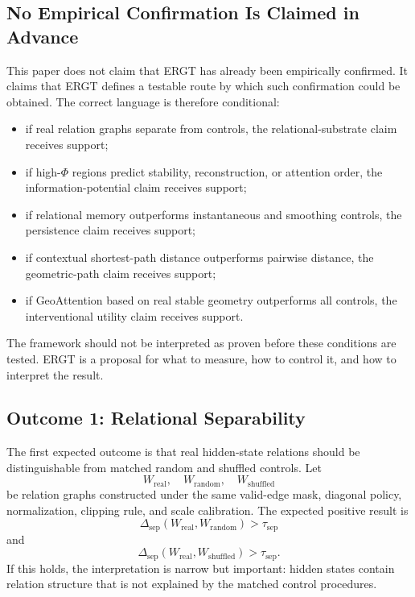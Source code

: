 \documentclass[11pt]{article}
\begin{document}
\subsection{No Empirical Confirmation Is Claimed in Advance}

This paper does not claim that ERGT has already been empirically confirmed. It claims that ERGT defines a testable route by which such confirmation could be obtained. The correct language is therefore conditional:
\begin{itemize}[leftmargin=2em]
    \item if real relation graphs separate from controls, the relational-substrate claim receives support;
    \item if high-$\Phi$ regions predict stability, reconstruction, or attention order, the information-potential claim receives support;
    \item if relational memory outperforms instantaneous and smoothing controls, the persistence claim receives support;
    \item if contextual shortest-path distance outperforms pairwise distance, the geometric-path claim receives support;
    \item if GeoAttention based on real stable geometry outperforms all controls, the interventional utility claim receives support.
\end{itemize}

The framework should not be interpreted as proven before these conditions are tested. ERGT is a proposal for what to measure, how to control it, and how to interpret the result.

\subsection{Outcome 1: Relational Separability}

The first expected outcome is that real hidden-state relations should be distinguishable from matched random and shuffled controls. Let
\[
W_{\mathrm{real}},\quad W_{\mathrm{random}},\quad W_{\mathrm{shuffled}}
\]
be relation graphs constructed under the same valid-edge mask, diagonal policy, normalization, clipping rule, and scale calibration. The expected positive result is
\[
\Delta_{\mathrm{sep}}(W_{\mathrm{real}},W_{\mathrm{random}})>\tau_{\mathrm{sep}}
\]
and
\[
\Delta_{\mathrm{sep}}(W_{\mathrm{real}},W_{\mathrm{shuffled}})>\tau_{\mathrm{sep}}.
\]
If this holds, the interpretation is narrow but important: hidden states contain relation structure that is not explained by the matched control procedures.
\end{document}
